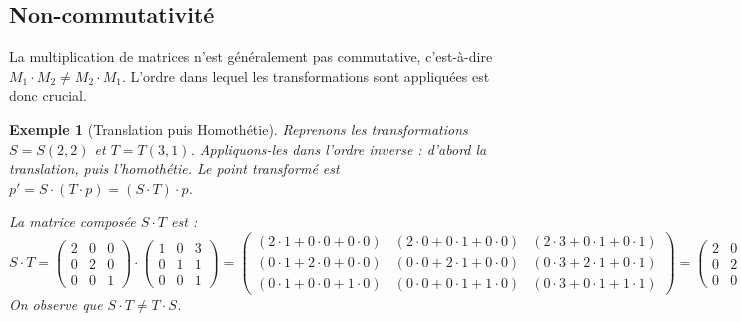 \documentclass{article}
\newtheorem{example}{Exemple}
\begin{document}
\subsection{Non-commutativité}
La multiplication de matrices n'est généralement pas commutative, c'est-à-dire $M_1 \cdot M_2 \neq M_2 \cdot M_1$. L'ordre dans lequel les transformations sont appliquées est donc crucial.

\begin{example}[Translation puis Homothétie]
Reprenons les transformations $S = S(2,2)$ et $T = T(3,1)$. Appliquons-les dans l'ordre inverse : d'abord la translation, puis l'homothétie. Le point transformé est $p' = S \cdot (T \cdot p) = (S \cdot T) \cdot p$.

La matrice composée $S \cdot T$ est :
\[
S \cdot T = \begin{pmatrix} 2 & 0 & 0 \\ 0 & 2 & 0 \\ 0 & 0 & 1 \end{pmatrix} \cdot
            \begin{pmatrix} 1 & 0 & 3 \\ 0 & 1 & 1 \\ 0 & 0 & 1 \end{pmatrix} =
            \begin{pmatrix} (2\cdot1+0\cdot0+0\cdot0) & (2\cdot0+0\cdot1+0\cdot0) & (2\cdot3+0\cdot1+0\cdot1) \\
                            (0\cdot1+2\cdot0+0\cdot0) & (0\cdot0+2\cdot1+0\cdot0) & (0\cdot3+2\cdot1+0\cdot1) \\
                            (0\cdot1+0\cdot0+1\cdot0) & (0\cdot0+0\cdot1+1\cdot0) & (0\cdot3+0\cdot1+1\cdot1) \end{pmatrix} =
            \begin{pmatrix} 2 & 0 & 6 \\ 0 & 2 & 2 \\ 0 & 0 & 1 \end{pmatrix}
\]
On observe que $S \cdot T \neq T \cdot S$.


\end{example}
\end{document}
